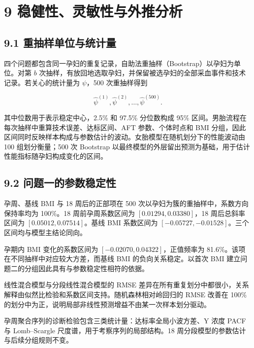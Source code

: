 \documentclass[UTF8,fontset=fandol,zihao=-4,a4paper]{ctexart}
\begin{document}
\FloatBarrier

\section{9
稳健性、灵敏性与外推分析}\label{ux7a33ux5065ux6027ux7075ux654fux6027ux4e0eux5916ux63a8ux5206ux6790}

\subsection{9.1
重抽样单位与统计量}\label{ux91cdux62bdux6837ux5355ux4f4dux4e0eux7edfux8ba1ux91cf}

四个问题都包含同一孕妇的重复记录，自助法重抽样（Bootstrap）以孕妇为单位。对第
\(b\)
次抽样，有放回地选取孕妇，并保留被选孕妇的全部采血事件和技术记录。若关心的统计量为
\(\psi\)，500 次重抽样得到

\[
\widehat\psi^{(1)},\widehat\psi^{(2)},
\ldots,\widehat\psi^{(500)}.
\tag{67}
\]

其中位数用于表示稳定中心，2.5\% 和 97.5\% 分位数构成 95\%
区间。男胎流程在每次抽样中重算技术误差、达标区间、AFT 参数、个体时点和
BMI
分组，因此区间同时反映样本构成与参数估计的波动。女胎模型在随机划分下的性能波动由
100 组划分衡量；500 次 Bootstrap
以最终模型的外层留出预测为基础，用于估计性能指标随孕妇构成变化的区间。

\subsection{9.2
问题一的参数稳定性}\label{ux95eeux9898ux4e00ux7684ux53c2ux6570ux7a33ux5b9aux6027}

孕周、基线 BMI 与 18 周后的正部项在 500
次以孕妇为簇的重抽样中，系数方向保持率均为 100\%。18 周前孕周系数区间为
\([0.01294,0.03380]\)，18 周后总斜率区间为 \([0.05012,0.07514]\)。基线
BMI 系数区间为 \([-0.05727,-0.01528]\)。三个区间均与模型主结论同向。

孕期内 BMI 变化的系数区间为 \([-0.02070,0.04322]\)，正值频率为
81.6\%。该项在不同抽样中对应较大方差，而基线 BMI 的负向关系稳定。以首次
BMI 建立问题二的分组因此具有与参数稳定性相符的依据。

线性混合模型与分段线性混合模型的 RMSE
差异在所有重复划分中都很小，关系解释由似然比检验和系数区间支持。随机森林相对岭回归的
RMSE 改善在 100\%
的划分中为正，说明局部非线性预测增益不由某一次样本划分驱动。

孕周聚合序列的诊断检验包含三类统计量：达标率全局小波方差、Y 浓度 PACF 与
Lomb--Scargle 尺度谱，用于考察序列的局部结构。18
周分段模型的参数估计与后续分组规则不变。
\end{document}
